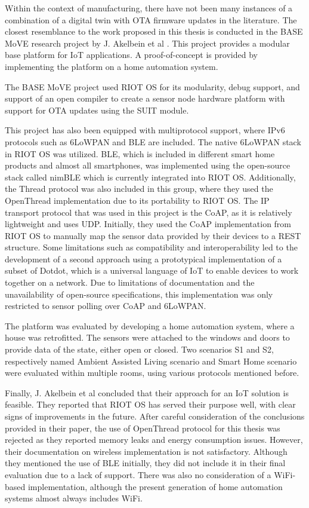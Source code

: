 Within the context of manufacturing, there have not been many instances of a combination of a digital twin with \acrshort{OTA} firmware updates in the literature. The closest resemblance to the work proposed in this thesis is conducted in the BASE MoVE research project by J. Akelbein et al \cite{mci/Akelbein2021}. This project provides a modular base platform for \acrshort{IoT} applications. A proof-of-concept is provided by implementing the platform on a home automation system.

The BASE MoVE project used RIOT OS for its modularity, debug support, and support of an open compiler to create a sensor node hardware platform with support for \acrshort{OTA} updates using the SUIT module.

This project has also been equipped with multiprotocol support, where IPv6 protocols such as 6LoWPAN and \acrshort{BLE} are included. The native 6LoWPAN stack in RIOT OS was utilized. \acrshort{BLE}, which is included in different smart home products and almost all smartphones, was implemented using the open-source stack called nimBLE which is currently integrated into RIOT OS. Additionally, the Thread protocol was also included in this group, where they used the OpenThread implementation due to its portability to RIOT OS. The IP transport protocol that was used in this project is the \acrfull{CoAP}, as it is relatively lightweight and uses UDP. Initially, they used the \acrshort{CoAP} implementation from RIOT OS to manually map the sensor data provided by their devices to a REST structure. Some limitations such as compatibility and interoperability led to the development of a second approach using a prototypical implementation of a subset of Dotdot, which is a universal language of \acrshort{IoT} to enable devices to work together on a network. Due to limitations of documentation and the unavailability of open-source specifications, this implementation was only restricted to sensor polling over \acrshort{CoAP} and 6LoWPAN.

The platform was evaluated by developing a home automation system, where a house was retrofitted. The sensors were attached to the windows and doors to provide data of the state, either open or closed. Two scenarios S1 and S2, respectively named Ambient Assisted Living scenario and Smart Home scenario were evaluated within multiple rooms, using various protocols mentioned before.

Finally, J. Akelbein et al concluded that their approach for an IoT solution is feasible. They reported that RIOT OS has served their purpose well, with clear signs of improvements in the future. After careful consideration of the conclusions provided in their paper, the use of OpenThread protocol for this thesis was rejected as they reported memory leaks and energy consumption issues. However, their documentation on wireless implementation is not satisfactory. Although they mentioned the use of \acrshort{BLE} initially, they did not include it in their final evaluation due to a lack of support. There was also no consideration of a WiFi-based implementation, although the present generation of home automation systems almost always includes WiFi.

